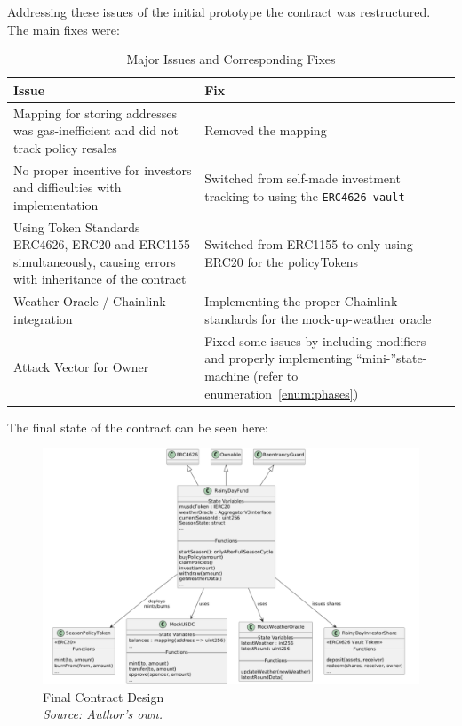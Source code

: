 \documentclass[11pt,a4paper]{article}
\begin{document}
	Addressing these issues of the initial prototype the contract was restructured.
    The main fixes were:

    \begin{table}[H]
        \centering
        \caption{Major Issues and Corresponding Fixes}
        \label{tab:issues-fixes}
        \begin{tabular}{|p{}|p{}|}
            \hline
            \textbf{Issue} & \textbf{Fix} \\
            \hline
            Mapping for storing addresses was gas-inefficient and did not track policy resales & Removed the mapping \\
            \hline
            No proper incentive for investors and difficulties with implementation & Switched from self-made investment tracking to using the \texttt{ERC4626 vault} \\
            \hline
            Using Token Standards ERC4626, ERC20 and ERC1155 simultaneously, causing errors with inheritance of the contract & Switched from ERC1155 to only using ERC20 for the policyTokens \\
            \hline
            Weather Oracle / Chainlink integration & Implementing the proper Chainlink standards for the mock-up-weather oracle~\parencite{AggregatorV3Interface} \\
            \hline
            Attack Vector for Owner & Fixed some issues by including modifiers and properly implementing \enquote{mini-}state-machine (refer to enumeration~\ref{enum:phases}) \\
            \hline
        \end{tabular}
    \end{table}

    The final state of the contract can be seen here:

    \begin{figure}[H]
        \centering
        \includegraphics[scale=0.5]{graphics/ClassDiagram_New}
        \caption{Final Contract Design \\ \textit{Source: Author's own.}}
        \label{fig:final-contract-design}
    \end{figure}
\end{document}
